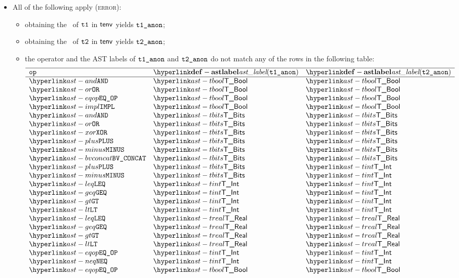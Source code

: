 \begin{itemize}
  \item All of the following apply (\textsc{error}):
  \begin{itemize}
    \item obtaining the \underlyingtype\ of $\texttt{t1}$ in $\textsf{tenv}$ yields $\texttt{t1\_anon}$\ProseOrTypeError;
    \item obtaining the \underlyingtype\ of $\texttt{t2}$ in $\textsf{tenv}$ yields $\texttt{t2\_anon}$\ProseOrTypeError;
    \item the operator and the AST labels of $\texttt{t1\_anon}$ and $\texttt{t2\_anon}$ do not match any of the rows in the following table:
    \[
    \begin{array}{lll}
      \hline
      \mathbf{\op} & \mathbf{\astlabel(\vtoneanon)} & \mathbf{\astlabel(\vttwoanon)} \\
      \hline
      \AND     & \TBool  & \TBool\\
      \OR      & \TBool  & \TBool\\
      \EQOP    & \TBool  & \TBool\\
      \IMPL    & \TBool  & \TBool\\
      \AND     & \TBits  & \TBits\\
      \OR      & \TBits  & \TBits\\
      \XOR     & \TBits  & \TBits\\
      \PLUS    & \TBits  & \TBits\\
      \MINUS   & \TBits  & \TBits\\
      \BVCONCAT & \TBits  & \TBits\\
      \PLUS    & \TBits  & \TInt\\
      \MINUS   & \TBits  & \TInt\\
      \LEQ     & \TInt     & \TInt\\
      \GEQ     & \TInt     & \TInt\\
      \GT      & \TInt     & \TInt\\
      \LT      & \TInt     & \TInt\\
      \LEQ     & \TReal    & \TReal\\
      \GEQ     & \TReal    & \TReal\\
      \GT      & \TReal    & \TReal\\
      \LT      & \TReal    & \TReal\\
      \EQOP    & \TInt     & \TInt\\
      \NEQ     & \TInt     & \TInt\\
      \EQOP    & \TBool    & \TBool\\

\end{array}\]
\end{itemize}
\end{itemize}
